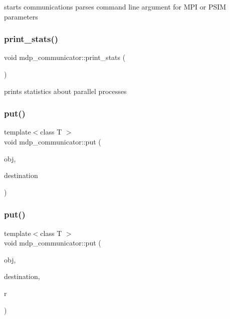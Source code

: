 starts communications parses command line argument for M\+PI or P\+S\+IM parameters \mbox{\label{classmdp__communicator_a33ee55b0c67b1f63fd3a100e36fcc35e}} 
\subsubsection{\texorpdfstring{print\+\_\+stats()}{print\_stats()}}
{\footnotesize\ttfamily void mdp\+\_\+communicator\+::print\+\_\+stats (\begin{DoxyParamCaption}{ }\end{DoxyParamCaption})\hspace{0.3cm}{\ttfamily [inline]}}



prints statistics about parallel processes 

\mbox{\label{classmdp__communicator_a16cb893e7fdbf67e04f8f8b21ee7caff}} 
\subsubsection{\texorpdfstring{put()}{put()}\hspace{0.1cm}{\footnotesize\ttfamily [1/4]}}
{\footnotesize\ttfamily template$<$class T $>$ \\
void mdp\+\_\+communicator\+::put (\begin{DoxyParamCaption}\item[{T \&}]{obj,  }\item[{int}]{destination }\end{DoxyParamCaption})\hspace{0.3cm}{\ttfamily [inline]}}

\mbox{\label{classmdp__communicator_a609cf23b630d037cc39d9cdd7c8fc165}} 
\subsubsection{\texorpdfstring{put()}{put()}\hspace{0.1cm}{\footnotesize\ttfamily [2/4]}}
{\footnotesize\ttfamily template$<$class T $>$ \\
void mdp\+\_\+communicator\+::put (\begin{DoxyParamCaption}\item[{T \&}]{obj,  }\item[{int}]{destination,  }\item[{\hyperlink{mdp__communicator_8h_ad8cbf5bc85a849902c39cd29d3f9a8f1}{mdp\+\_\+request} \&}]{r }\end{DoxyParamCaption})\hspace{0.3cm}{\ttfamily [inline]}}

